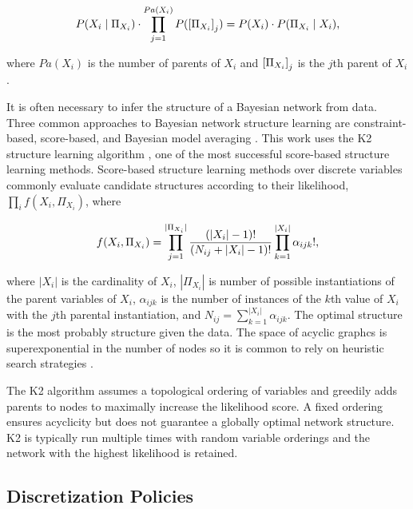 \begin{equation}
P(X_i \mid \Pi_{X_i}) \cdot \prod_{j = 1}^{ Pa( X_i)} P( \brock{\Pi_{X_i} }_j) = P(X_i) \cdot P(\Pi_{X_i} \mid X_i)\text{,}
\end{equation}

\noindent
where $Pa(X_i)$ is the number of parents of $X_i$ and $\brock{\Pi_{X_i}}_j$ is the $j$th parent of $X_i$.

It is often necessary to infer the structure of a Bayesian network from data.
Three common approaches to Bayesian network structure learning are constraint-based, score-based, and Bayesian model averaging \citep[see][chap.~18]{PGM_2009}. This work uses the K2 structure learning algorithm \citep{K2}, one of the most successful score-based structure learning methods.
Score-based structure learning methods over discrete variables commonly evaluate candidate structures according to their likelihood, $\prod_i f(X_i, \Pi_{X_i})$, where

\begin{align}
f(X_i, \Pi_{X_i}) = \prod_{j=1}^{|\Pi_{X_i}|} {{(|X_i|-1)!}\over{(N_{ij} + |X_i|-1)!}} \prod_{k=1}^{|X_i|} \alpha_{ijk}!\text{,}
\end{align}

\noindent
where $|X_i|$ is the cardinality of $X_i$, $|\Pi_{X_i}|$ is number of possible instantiations of the parent variables of $X_i$, $\alpha_{ijk}$ is the number of instances of the $k$th value of $X_i$ with the $j$th parental instantiation, and $N_{ij} = \sum_{k=1}^{|X_i|} \alpha_{ijk}$.
The optimal structure is the most probably structure given the data.
The space of acyclic graphcs is superexponential in the number of nodes so it is common to rely on heuristic search strategies \citep{PGM_2009}.

The K2 algorithm assumes a topological ordering of variables and greedily adds parents to nodes to maximally increase the likelihood score.
A fixed ordering ensures acyclicity but does not guarantee a globally optimal network structure.
K2 is typically run multiple times with random variable orderings and the network with the highest likelihood is retained.

\subsection{Discretization Policies}

